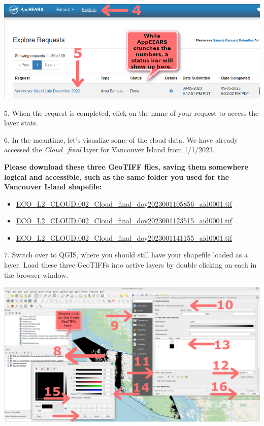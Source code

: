 \documentclass[oneside,a4paper,11pt,explicit]{book}
\begin{document}
	\centerline{\includegraphics[width=.75\textwidth]{ExploreRequest.png}}
	
	5. When the request is completed, click on the name of your request to access the layer stats.
	
	6. In the meantime, let's visualize some of the cloud data. We have already accessed the \textit{Cloud\_final} layer for Vancouver Island from 1/1/2023. 
	
	\begin{tcolorbox}[colback=yellow!5!white,title=\textbf{Vancouver Island \textit{Cloud\_final} Layer Files}]
			
		\textbf{Please download these three GeoTIFF files, saving them somewhere logical and accessible, such as the same folder you used for the Vancouver Island shapefile:}
			
		\vspace{-1em}
			
		\begin{itemize}
			\item \href{https://jeremydforsythe.github.io/icecream-tutorials/Tutorial6_CloudyDays/ECO_L2_CLOUD.002_Cloud_final_doy2023001105856_aid0001.tif}{ECO\_L2\_CLOUD.002\_Cloud\_final\_doy2023001105856\_aid0001.tif}
			\item \href{https://jeremydforsythe.github.io/icecream-tutorials/Tutorial6_CloudyDays/ECO_L2_CLOUD.002_Cloud_final_doy2023001123515_aid0001.tif}{ECO\_L2\_CLOUD.002\_Cloud\_final\_doy2023001123515\_aid0001.tif}
			\item \href{https://jeremydforsythe.github.io/icecream-tutorials/Tutorial6_CloudyDays/ECO_L2_CLOUD.002_Cloud_final_doy2023001141155_aid0001.tif}{ECO\_L2\_CLOUD.002\_Cloud\_final\_doy2023001141155\_aid0001.tif}
		\end{itemize}
			
	\end{tcolorbox}
	
	7. Switch over to QGIS, where you should still have your shapefile loaded as a layer. Load these three GeoTIFFs into active layers by double clicking on each in the browser window.
	
	\centerline{\includegraphics[width=.875\textwidth]{Cloud_final_AddLayer.png}}
	
\end{document}
